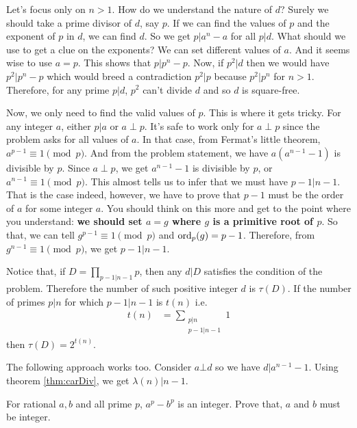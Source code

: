 \documentclass[problems.tex]{subfile}
\begin{document}
	\begin{solution}
		Let's focus only on $n>1$. How do we understand the nature of $d$? Surely we should take a prime divisor of $d$, say $p$. If we can find the values of $p$ and the exponent of $p$ in $d$, we can find $d$. So we get $p|a^n-a$ for all $p|d$. What should we use to get a clue on the exponents? We can set different values of $a$. And it seems wise to use $a=p$. This shows that $p|p^n-p$. Now, if $p^2|d$ then we would have $p^2|p^n-p$ which would breed a contradiction $p^2|p$ because $p^2|p^n$ for $n>1$. Therefore, for any prime $p|d$, $p^2$ can't divide $d$ and so $d$ is square-free.
		
		Now, we only need to find the valid values of $p$. This is where it gets tricky. For any integer $a$, either $p|a$ or $a\perp p$. It's safe to work only for $a\perp p$ since the problem asks for all values of $a$. In that case, from Fermat's little theorem, $a^{p-1}\equiv1\pmod p$. And from the problem statement, we have $a(a^{n-1}-1)$ is divisible by $p$. Since $a\perp p$, we get $a^{n-1}-1$ is divisible by $p$, or $a^{n-1}\equiv1\pmod p$. This almost tells us to infer that we must have $p-1|n-1$. That is the case indeed, however, we have to prove that $p-1$ must be the order of $a$ for some integer $a$. You should think on this more and get to the point where you understand: \textbf{we should set $a=g$ where $g$ is a primitive root of $p$}. So that, we can tell $g^{p-1}\equiv1\pmod p$ and $\operatorname{ord}_p(g)=p-1$. Therefore, from $g^{n-1}\equiv1\pmod p$, we get $p-1|n-1$.
		
		Notice that, if $D=\prod\limits_{p-1|n-1}p$, then any $d|D$ satisfies the condition of the problem. Therefore the number of such positive integer $d$ is $\tau(D)$. If the number of primes $p|n$ for which $p-1|n-1$ is $t(n)$ i.e.
			\begin{align*}
				t(n) & = \sum\limits_{\substack{p|n\\p-1|n-1}}1
			\end{align*}
		then $\tau(D) = 2^{t(n)}$.
	\end{solution}
	
	\begin{note}
		The following approach works too. Consider $a\bot d$ so we have $d|a^{n-1}-1$. Using theorem \eqref{thm:carDiv}, we get $\lambda(n)|n-1$.
	\end{note}
	
	\begin{problem}
		For rational $a,b$ and all prime $p$, $a^p-b^p$ is an integer. Prove that, $a$ and $b$ must be integer.
	\end{problem}
	
\end{document}
